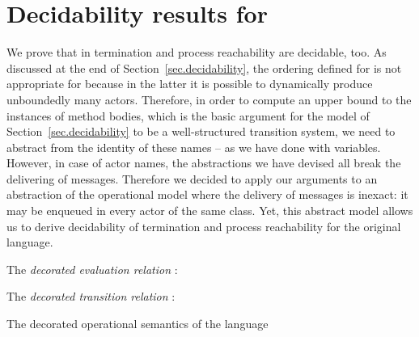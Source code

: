 \documentclass{LMCS}
\theoremstyle{plain}\newtheorem{proposition}[thm]{Proposition}
\theoremstyle{plain}\newtheorem{lemma}[thm]{Lemma}
\theoremstyle{plain}\newtheorem{theorem}[thm]{Theorem}
\theoremstyle{plain}\newtheorem{corollary}[thm]{Corollary}
\newcommand{\lleadsto}[1]{\stackrel{#1}{\leadsto}}
\newcommand{\actroba}{}
\newcommand{\actsl}{}
\begin{document}
\section{Decidability results for {\actsl}}
\label{sec.stateless}

\newcommand{\name}[1]{{\it name}(#1)}
\newcommand{\abseval}[1]{\lleadsto{#1}_\alpha}
\newcommand{\absred}[1]{\stackrel{#1}{\longrightarrow_{\mathsf a}}}
\newcommand{\abst}[1]{\Omega(#1)}
\newcommand{\rearrange}{\bowtie}
\newcommand{\shuffle}[2]{\it shuffle(#1,#2)}
\newcommand{\shuffleq}[2]{\it [\!\![ #1 ]\!\!]_{#2}}
\newcommand{\mulset}{\mathcal M}
\newcommand{\trans}[2]{\ensuremath{\xrightarrow{#1}}}
\newcommand{\abtrans}[2]{\ensuremath{\xrightarrow{#1}}_{\mathsf a}}
\newcommand{\code}[1]{\ensuremath{\mathcal{Q}(#1)}}







We prove that in {\actsl}
termination and process reachability are decidable, too.
As discussed at the end of Section~\ref{sec.decidability},
the ordering defined for {\actroba} is not appropriate for {\actsl}
because in the latter it is possible to dynamically produce unboundedly many actors.
Therefore, in order to compute an upper bound to
the instances of method bodies, which is the basic argument for the model of
Section~\ref{sec.decidability} to be a well-structured transition system, 
we need to abstract
from the identity of these names -- as we have done with variables.
However, in case of actor names, the abstractions we have devised all break the
delivering of messages. 
Therefore we decided to apply our arguments to an abstraction of the operational model where the delivery of messages is inexact: it may be enqueued in every actor of the same class. 
Yet, this abstract model allows us
to derive decidability of termination and process reachability for the original language. 

\begin{table}[t]
The \emph{decorated evaluation relation} : 

The \emph{decorated transition relation} :

\caption{\label{tab.decopsem} The decorated operational semantics of the language {\actsl}}
\end{table}
\end{document}

